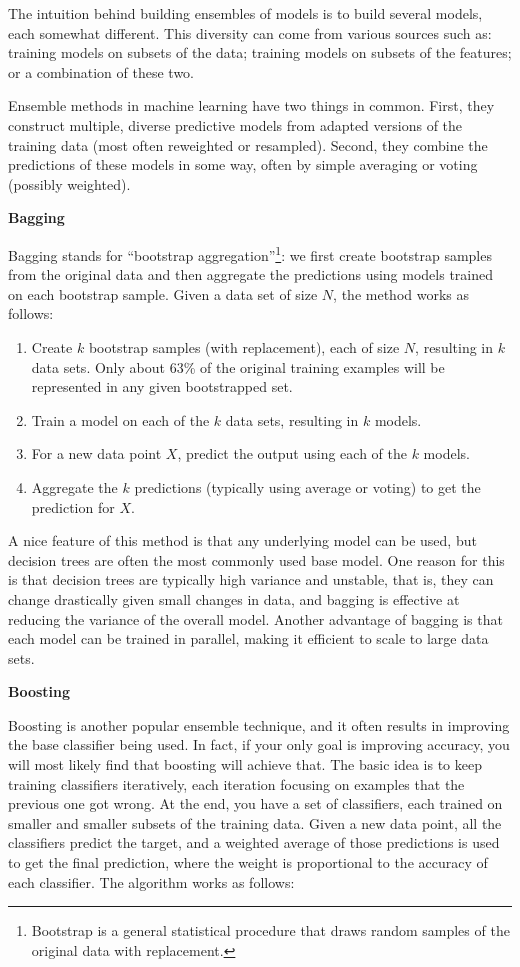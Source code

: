 \documentclass[]{krantz}
\begin{document}
The intuition behind building ensembles of models is to build several
models, each somewhat different. This diversity can come from various
sources such as: training models on subsets of the data; training models
on subsets of the features; or a combination of these two.

Ensemble methods in machine learning have two things in common. First,
they construct multiple, diverse predictive models from adapted versions
of the training data (most often reweighted or resampled). Second, they
combine the predictions of these models in some way, often by simple
averaging or voting (possibly weighted).

\textbf{Bagging}

Bagging stands for ``bootstrap aggregation''\footnote{Bootstrap is a
  general statistical procedure that draws random samples of the
  original data with replacement.}: we first create bootstrap samples
from the original data and then aggregate the predictions using models
trained on each bootstrap sample. Given a data set of size \(N\), the
method works as follows:

\begin{enumerate}
\def\labelenumi{\arabic{enumi}.}
\item
  Create \(k\) bootstrap samples (with replacement), each of size \(N\),
  resulting in \(k\) data sets. Only about 63\% of the original training
  examples will be represented in any given bootstrapped set.
\item
  Train a model on each of the \(k\) data sets, resulting in \(k\)
  models.
\item
  For a new data point \(X\), predict the output using each of the \(k\)
  models.
\item
  Aggregate the \(k\) predictions (typically using average or voting) to
  get the prediction for \(X\).
\end{enumerate}

A nice feature of this method is that any underlying model can be used,
but decision trees are often the most commonly used base model. One
reason for this is that decision trees are typically high variance and
unstable, that is, they can change drastically given small changes in
data, and bagging is effective at reducing the variance of the overall
model. Another advantage of bagging is that each model can be trained in
parallel, making it efficient to scale to large data sets.

\textbf{Boosting}

Boosting is another popular ensemble technique, and it often results in
improving the base classifier being used. In fact, if your only goal is
improving accuracy, you will most likely find that boosting will achieve
that. The basic idea is to keep training classifiers iteratively, each
iteration focusing on examples that the previous one got wrong. At the
end, you have a set of classifiers, each trained on smaller and smaller
subsets of the training data. Given a new data point, all the
classifiers predict the target, and a weighted average of those
predictions is used to get the final prediction, where the weight is
proportional to the accuracy of each classifier. The algorithm works as
follows:
\end{document}
